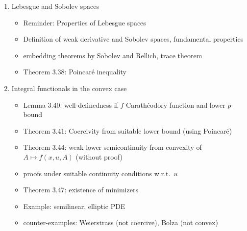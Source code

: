 \documentclass[12pt,a4paper]{article}
\begin{document}
\begin{enumerate}
\begin{enumerate}
        \item Lebesgue and Sobolev spaces
        \begin{itemize}
            \item Reminder: Properties of Lebesgue spaces
            \item Definition of weak derivative and Sobolev spaces, fundamental properties
            \item embedding theorems by Sobolev and Rellich, trace theorem
            \item Theorem 3.38: Poincaré inequality
        \end{itemize}
        
        \item Integral functionals in the convex case
        \begin{itemize}
            \item Lemma 3.40: well-definedness if $f$ Carathéodory function and lower $p$-bound
            \item Theorem 3.41: Coercivity from suitable lower bound (using Poincaré)
            \item Theorem 3.44: weak lower semicontinuity from convexity of $A\mapsto f(x,u,A)$ (without proof)
            \item proofs under suitable continuity conditions w.r.t.~$u$
            \item Theorem 3.47: existence of minimizers
            \item Example: semilinear, elliptic PDE
            \item counter-examples: Weierstrass (not coercive), Bolza (not convex)
        \end{itemize}
        

\end{enumerate}
\end{enumerate}
\end{document}
